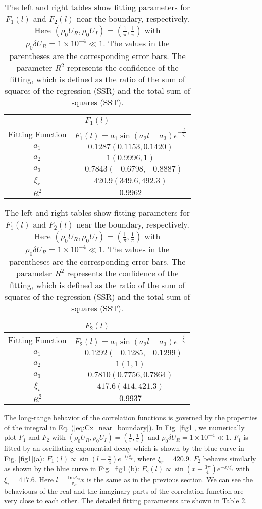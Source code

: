 \documentclass[aps,prl,twocolumn,nofootinbib,superscriptaddress,longbibliography]{revtex4-1}
\begin{document}
\begin{table}
	\begin{tabular}{|c|c|}
		\hline 
		\multicolumn{2}{|c|}{$F_{1}(l)$}\tabularnewline		
		\hline
		\hline 
		Fitting Function & $F_1(l)=a_{1}\sin(a_{2}l-a_{3})e^{-\frac{l}{\xi_{r}}}$\tabularnewline
		\hline 
		$a_{1}$ & $0.1287(0.1153,0.1420)$\tabularnewline
		\hline 
		$a_{2}$ & $1(0.9996,1)$\tabularnewline
		\hline 
		$a_{3}$ & $-0.7843(-0.6798,-0.8887)$\tabularnewline
		\hline 
		$\xi_{r}$ & $420.9(349.6,492.3)$\tabularnewline
		\hline 
		$R^{2}$ & $0.9962$\tabularnewline
		\hline 
	\end{tabular}%
	\begin{tabular}{|c|c|}
		\hline 
		\multicolumn{2}{|c|}{$F_{2}(l)$}\tabularnewline
		\hline
		\hline 
		Fitting Function & $F_2(l)=a_{1}\sin(a_{2}l-a_{3})e^{-\frac{l}{\xi_i}}$\tabularnewline
		\hline 
		$a_{1}$ & $-0.1292(-0.1285,-0.1299)$\tabularnewline
		\hline 
		$a_{2}$ & $1(1,1)$\tabularnewline
		\hline 
		$a_{3}$ & $0.7810(0.7756,0.7864)$\tabularnewline
		\hline 
		$\xi_{i}$ & $417.6(414,421.3)$\tabularnewline
		\hline 
		$R^{2}$ & $0.9937$\tabularnewline
		\hline 
	\end{tabular}
	
	\caption{The left and right tables show fitting parameters for $F_1(l)$ and $F_2(l)$ near the boundary, respectively. Here $(\rho_{0}U_{R},\rho_{0}U_{I})=(\frac{1}{\pi},\frac{1}{\pi})$ with $\rho_{0}\delta U_{R}=1\times10^{-4}\ll1$. The values in the parentheses are the corresponding error bars. The parameter $R^2$ represents the confidence of the fitting, which is defined as the ratio of the sum of squares of the regression (SSR) and the total sum of squares (SST).}
	\label{Fitting_table_1}
\end{table}
The long-range behavior of the correlation functions is governed by the properties of the integral in Eq. (\ref{eq:Cx_near_boundary}). In Fig. \ref{fig1}, we numerically plot $F_1$ and $F_2$ with $(\rho_{0}U_{R},\rho_{0}U_{I})=(\frac{1}{\pi},\frac{1}{\pi})$ and $\rho_{0}\delta U_{R}=1\times10^{-4}\ll1$. $F_1$ is fitted by an oscillating exponential decay  which is shown by the blue curve
in Fig. \ref{fig1}(a): $F_1(l)\propto\sin(l+\frac{\pi}{4})e^{-l/\xi_{r}}$,
where $\xi_{r}=420.9$. $F_2$ behaves similarly as
shown by the blue curve in Fig. \ref{fig1}(b): $F_2(l) \propto\sin(x+\frac{3\pi}{4})e^{-x/\xi_{i}}$
with $\xi_{i}=417.6$. Here $l=\frac{\text{Im}\Delta_0}{v_F}x$ is the same as in the previous section. We can see the behaviours of the real and the
imaginary parts of the correlation function are very close
to each other. The detailed fitting parameters are shown in Table \ref{Fitting_table_1}.
\end{document}
